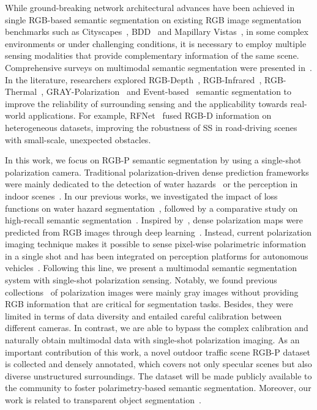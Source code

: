 \documentclass{osa-article}
\begin{document}
While ground-breaking network architectural advances have been achieved in single RGB-based semantic segmentation on existing RGB image segmentation benchmarks such as Cityscapes~\cite{cordts2016cityscapes}, BDD~\cite{yu2020bdd100k} and Mapillary Vistas~\cite{neuhold2017mapillary}, in some complex environments or under challenging conditions, it is necessary to employ multiple sensing modalities that provide complementary information of the same scene.
Comprehensive surveys on multimodal semantic segmentation were presented in~\cite{feng2020deep,zhang2020deep}.
In the literature, researchers explored RGB-Depth~\cite{hu2019acnet,sun2020real}, RGB-Infrared~\cite{valada2016deep,choe2018ranus}, RGB-Thermal~\cite{li2020segmenting,vertens2020heatnet}, GRAY-Polarization~\cite{zhang2019exploration,blanchon2019outdoor} and Event-based~\cite{zhang2020issafe,alonso2019ev}
semantic segmentation to improve the reliability of surrounding sensing and the applicability towards real-world applications.
For example, RFNet~\cite{sun2020real} fused RGB-D information on heterogeneous datasets, improving the robustness of SS in road-driving scenes with small-scale, unexpected obstacles.

In this work, we focus on RGB-P semantic segmentation by using a single-shot polarization camera.
Traditional polarization-driven dense prediction frameworks were mainly dedicated to the detection of water hazards~\cite{yang2018perception,han2018single} or the perception in indoor scenes~\cite{huang2017target,berger2017depth}.
In our previous works, we investigated the impact of loss functions on water hazard segmentation~\cite{xiang2019importance}, followed by a comparative study on high-recall semantic segmentation~\cite{xiang2019comparative}.
Inspired by~\cite{huang2017target}, dense polarization maps were predicted from RGB images through deep learning~\cite{yang2018predicting}.
Instead, current polarization imaging technique makes it possible to sense pixel-wise polarimetric information in a single shot and has been integrated on perception platforms for autonomous vehicles~\cite{sun2019multimodal}.
Following this line, we present a multimodal semantic segmentation system with single-shot polarization sensing.
Notably, we found previous collections~\cite{wang2017multimodality,zhang2019exploration,blanchon2019outdoor} of polarization images were mainly gray images without providing RGB information that are critical for segmentation tasks.
Besides, they were limited in terms of data diversity and entailed careful calibration between different cameras.
In contrast, we are able to bypass the complex calibration and naturally obtain multimodal data with single-shot polarization imaging.
As an important contribution of this work, a novel outdoor traffic scene RGB-P dataset is collected and densely annotated, which covers not only specular scenes but also diverse unstructured surroundings.
The dataset will be made publicly available to the community to foster polarimetry-based semantic segmentation.
Moreover, our work is related to transparent object segmentation~\cite{xie2020segmenting,kalra2020deep}.
\end{document}
